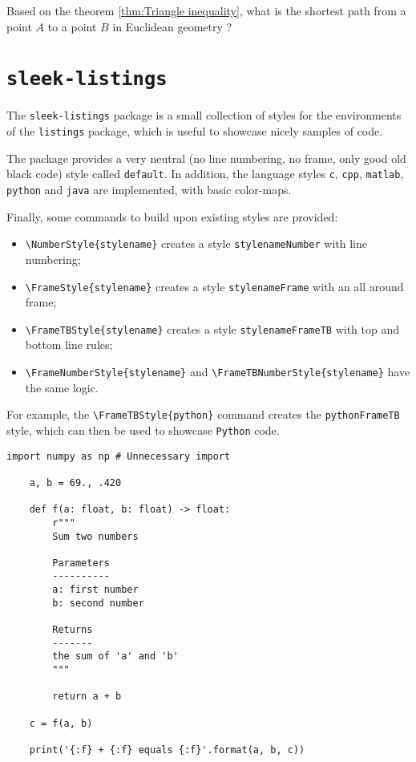 \documentclass[a4paper, 12pt]{report}
\def\tbs{\textbackslash}
\begin{document}
    \begin{fmd-question*}
        Based on the theorem \ref{thm:Triangle inequality}, what is the shortest path from a point $A$ to a point $B$ in Euclidean geometry ?
    \end{fmd-question*}

    \newpage

    \section{\texttt{sleek-listings}}

    The \texttt{sleek-listings} package is a small collection of styles for the environments of the \texttt{listings} package, which is useful to showcase nicely samples of code.

    The package provides a very neutral (no line numbering, no frame, only good old black code) style called \texttt{default}. In addition, the language styles \texttt{c}, \texttt{cpp}, \texttt{matlab}, \texttt{python} and \texttt{java} are implemented, with basic color-maps.

    Finally, some commands to build upon existing styles are provided:

    \begin{itemize}
        \item \texttt{\tbs{}NumberStyle\{stylename\}} creates a style \texttt{stylenameNumber} with line numbering;
        \item \texttt{\tbs{}FrameStyle\{stylename\}} creates a style \texttt{stylenameFrame} with an all around frame;
        \item \texttt{\tbs{}FrameTBStyle\{stylename\}} creates a style \texttt{stylenameFrameTB} with top and bottom line rules;
        \item \texttt{\tbs{}FrameNumberStyle\{stylename\}} and \texttt{\tbs{}FrameTBNumberStyle\{stylename\}} have the same logic.
    \end{itemize}

    For example, the \texttt{\tbs{}FrameTBStyle\{python\}} command creates the \texttt{pythonFrameTB} style, which can then be used to showcase \texttt{Python} code.

    \begin{lstlisting}[style=pythonFrameTB, gobble=4]
    import numpy as np # Unnecessary import

    a, b = 69., .420

    def f(a: float, b: float) -> float:
        r"""
        Sum two numbers

        Parameters
        ----------
        a: first number
        b: second number

        Returns
        -------
        the sum of 'a' and 'b'
        """

        return a + b

    c = f(a, b)

    print('{:f} + {:f} equals {:f}'.format(a, b, c))
    \end{lstlisting}
\end{document}
